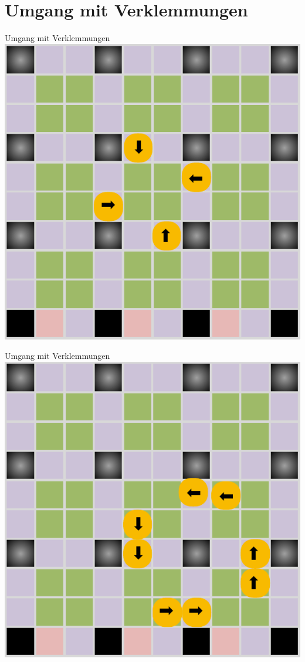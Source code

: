 \documentclass{beamer}
\begin{document}
\section{Umgang mit Verklemmungen}
\begin{frame}{Umgang mit Verklemmungen}
\centering
\includegraphics[height=0.75\textheight]{PDF/Deadlocks1.pdf}
\end{frame}\begin{frame}{Umgang mit Verklemmungen}
\centering
\includegraphics[height=0.75\textheight]{PDF/Deadlocks2.pdf}
\end{frame}
	\begin{frame}[title=Hauptgebaeude_Nacht.jpg]
		\maketitle
		\date{26. Mai 2018}
	\end{frame}
\end{document}
